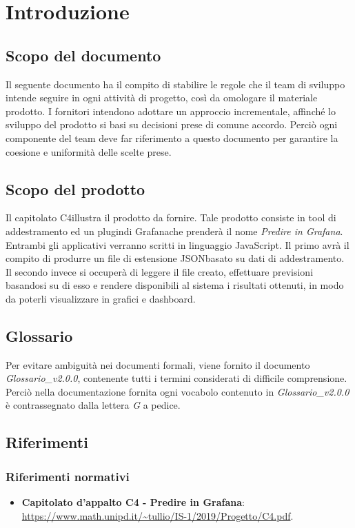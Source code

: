 \section{Introduzione}

\subsection{Scopo del documento}
Il seguente documento ha il compito di stabilire le regole che il team di sviluppo intende seguire in ogni attività di progetto, così da omologare il materiale prodotto.
I fornitori intendono adottare un approccio incrementale\glo, affinché lo sviluppo del prodotto si basi su decisioni prese di comune accordo. Perciò ogni componente del team deve far riferimento a questo documento per garantire la coesione e uniformità delle scelte prese.

\subsection{Scopo del prodotto}
Il capitolato {C4}\glo illustra il prodotto da fornire. Tale prodotto consiste in tool di addestramento ed un plugin\glo di Grafana\glo che prenderà il nome \textit{Predire in Grafana}. Entrambi gli applicativi verranno scritti in linguaggio JavaScript\glo. Il primo avrà il compito di produrre un file di estensione JSON\glo basato su dati di addestramento\glo. Il secondo invece si occuperà di leggere il file creato, effettuare previsioni basandosi su di esso e rendere disponibili al sistema i risultati ottenuti, in modo da poterli visualizzare in grafici e dashboard.
\subsection{Glossario}
Per evitare ambiguità nei documenti formali, viene fornito il documento \textit{Glossario\_v2.0.0}, contenente tutti i termini considerati di difficile comprensione. Perciò nella documentazione fornita ogni vocabolo contenuto in \textit{Glossario\_v2.0.0} è contrassegnato dalla lettera \textit{G} a pedice.
\subsection{Riferimenti}
\subsubsection{Riferimenti normativi}
\begin{itemize}
	\item \textbf{Capitolato d'appalto C4 - Predire in Grafana}: \\
	\url{https://www.math.unipd.it/~tullio/IS-1/2019/Progetto/C4.pdf}.	
\end{itemize}
